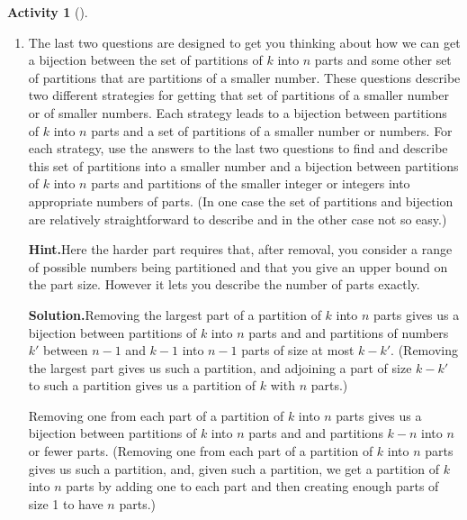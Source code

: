 \documentclass[10pt,]{book}
\theoremstyle{plain}
\theoremstyle{definition}
\newtheorem{activity}[project]{Activity}
\numberwithin{equation}{chapter}
\begin{document}
\begin{activity}[]
\begin{enumerate}[label=(\alph*)]
~\par
\item The last two questions are designed to get you thinking about how we can get a bijection between the set of partitions of \(k\) into \(n\) parts and some other set of partitions that are partitions of a smaller number.  These questions describe two different strategies for getting that set of partitions of a smaller number or of smaller numbers.  Each strategy leads to a bijection between partitions of \(k\) into \(n\) parts and a set of partitions of a smaller number or numbers.  For each strategy, use the answers to the last two questions to find and describe this set of partitions into a smaller number and a bijection between partitions of \(k\) into \(n\) parts and partitions of the smaller integer or integers into appropriate numbers of parts. (In one case the set of partitions and bijection are relatively straightforward to describe and in the other case not so easy.)%
\par\medskip\noindent%
\textbf{Hint.}\quad Here the harder part requires that, after removal, you consider a range of possible numbers being partitioned and that you give an upper bound on the part size. However it lets you describe the number of parts exactly.%
\par\medskip\noindent%
\textbf{Solution.}\quad Removing the largest part of a partition of \(k\) into \(n\) parts gives us a bijection between partitions of \(k\) into \(n\) parts and and partitions of numbers \(k'\) between \(n-1\) and \(k-1\) into \(n-1\) parts of size at most \(k-k'\). (Removing the largest part gives us such a partition, and adjoining a part of size \(k-k'\) to such a partition gives us a partition of \(k\) with \(n\) parts.)%
\par
Removing one from each part of a partition of \(k\) into \(n\) parts gives us a bijection between partitions of \(k\) into \(n\) parts and and partitions \(k-n\) into \(n\) or fewer parts. (Removing one from each part of a partition of \(k\) into \(n\) parts gives us such a partition, and, given such a partition, we get a partition of \(k\) into \(n\) parts by adding one to each part and then creating enough parts of size 1 to have \(n\) parts.)%


\end{enumerate}
\end{activity}
\end{document}
